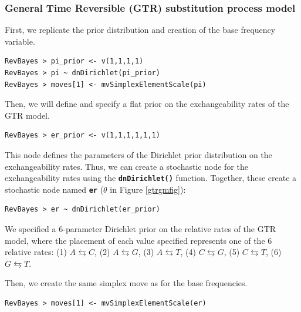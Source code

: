 \documentclass[11pt]{article}
\newcommand{\cl}[1]{{\texttt{\textbf{#1}}}}
\begin{document}
\subsubsection*{General Time Reversible (GTR) substitution process model}

First, we replicate the prior distribution and creation of the base frequency variable.
{\tt\small \begin{snugshade*}
\begin{lstlisting}
RevBayes > pi_prior <- v(1,1,1,1) 
RevBayes > pi ~ dnDirichlet(pi_prior)
RevBayes > moves[1] <- mvSimplexElementScale(pi) 
\end{lstlisting}
\end{snugshade*}}

Then, we will define and specify a flat prior on the exchangeability rates of the GTR model. 
{\tt \begin{snugshade*}
\begin{lstlisting}
RevBayes > er_prior <- v(1,1,1,1,1,1) 
\end{lstlisting}
\end{snugshade*}}

This node defines the parameters of the Dirichlet prior distribution on the exchangeability rates.
Thus, we can create a stochastic node for the exchangeability rates using the \cl{dnDirichlet()} function. 
Together, these create a stochastic node named \cl{er} ($\theta$ in Figure \ref{gtrgmfig}): 
{\tt \begin{snugshade*}
\begin{lstlisting}
RevBayes > er ~ dnDirichlet(er_prior)
\end{lstlisting}
\end{snugshade*}}


We specified a 6-parameter Dirichlet prior on the relative rates of the GTR model, where the placement of each value specified represents one of the 6 relative rates: 
(1) $A\leftrightarrows C$, 
(2) $A\leftrightarrows G$, 
(3) $A\leftrightarrows T$, 
(4) $C\leftrightarrows G$, 
(5) $C\leftrightarrows T$, 
(6) $G\leftrightarrows T$. 


Then, we create the same simplex move as for the base frequencies.
{\tt\small \begin{snugshade*}
\begin{lstlisting}
RevBayes > moves[1] <- mvSimplexElementScale(er) 
\end{lstlisting}
\end{snugshade*}}
\end{document}
